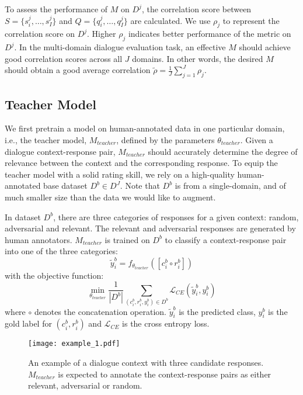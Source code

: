 \documentclass[letterpaper]{article} \usepackage{aaai22}  \usepackage{times}  \usepackage{helvet}  \usepackage{courier}  \usepackage[hyphens]{url}  \usepackage{graphicx} \urlstyle{rm} \def\UrlFont{\rm}  \usepackage{natbib}  \usepackage{caption} \DeclareCaptionStyle{ruled}{labelfont=normalfont,labelsep=colon,strut=off} \frenchspacing  \setlength{\pdfpagewidth}{8.5in}  \setlength{\pdfpageheight}{11in}  \usepackage{algorithm}
\begin{document}
To assess the performance of $M$ on $D^j$, the correlation score between $S = \{s_i^j,\ldots,s_I^j\}$ and $Q = \{q_i^j,\ldots,q_I^j\}$ are calculated. We use $\rho_j$ to represent the correlation score on $D^j$. Higher $\rho_j$ indicates better performance of the metric on $D^j$. In the multi-domain dialogue evaluation task, an effective $M$ should achieve good correlation scores across all ${J}$ domains. In other words, the desired $M$ should obtain a good average correlation $\tilde{\rho} = \frac{1}{J}\sum^{J}_{j=1}{\rho_j}$.

\subsection{Teacher Model}
\label{subsec:teacher-model}
We first pretrain a model on human-annotated data in one particular domain, i.e., the teacher model, $M_{teacher}$, defined by the parameters   $\theta_{teacher}$. Given a dialogue context-response pair, $M_{teacher}$ should accurately determine the degree of relevance between the context and the corresponding response. To equip the teacher model with a solid rating skill, we rely on a high-quality human-annotated base dataset $D^b\in{D^J}$. Note that $D^b$ is from a single-domain, and of much smaller size than the data we would like to augment. 

In dataset $D^b$, there are three categories of responses for a given context: random, adversarial and relevant. The relevant and adversarial responses are generated by human annotators. $M_{teacher}$ is trained on $D^b$ to classify a context-response pair into one of the three categories:
\begin{equation}
\tilde{y}_i^b = f_{\theta_{teacher}}([c_i^b \circ r_i^b])
\label{eq:teacher_prediction}
\end{equation}
with the objective function:
\begin{equation}
    \underset{\theta_{teacher}}{\min}\frac{1}{|D^b|}\sum_{(c_i^b, r_i^b, y_i^b)\in{D^b}}{\mathcal{L}_{CE}(\tilde{y}_i^b, y_i^b)}
\end{equation}
where $\circ$ denotes the concatenation operation. $\tilde{y}_i^b$ is the predicted class, $y_i^b$ is the gold label for $(c_i^b, r_i^b)$ and $\mathcal{L}_{CE}$ is the cross entropy loss. 

\begin{figure}[t!]
\centering
\texttt{[image: example\_1.pdf]} \caption{An example of a dialogue context with three candidate responses. $M_{teacher}$ is expected to annotate the context-response pairs as either relevant, adversarial or random.}  
\label{context-response-example}
\end{figure}
\end{document}

